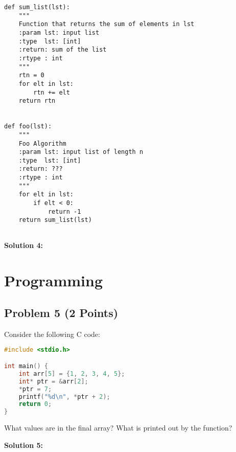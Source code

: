 \documentclass[]{article}
\begin{document}
\begin{lstlisting}
def sum_list(lst):
    """
    Function that returns the sum of elements in lst
    :param lst: input list
    :type  lst: [int]
    :return: sum of the list
    :rtype : int
    """
    rtn = 0
    for elt in lst:
        rtn += elt
    return rtn


def foo(lst):
    """
    Foo Algorithm
    :param lst: input list of length n
    :type  lst: [int]
    :return: ???
    :rtype : int
    """
    for elt in lst:
        if elt < 0:
            return -1
    return sum_list(lst)
        

\end{lstlisting}

\clearpage
\textbf{Solution 4:}

\clearpage
\section{Programming}
\subsection*{Problem 5 (2 Points)}

Consider the following C code:

\begin{lstlisting}[language=C]
#include <stdio.h>

int main() {
    int arr[5] = {1, 2, 3, 4, 5};
    int* ptr = &arr[2];
    *ptr = 7;
    printf("%d\n", *ptr + 2);
    return 0;
}
\end{lstlisting}

What values are in the final array? What is printed out by the function?

\bigskip
\bigskip
\bigskip
\textbf{Solution 5:}
\end{document}
